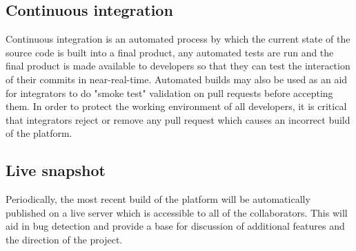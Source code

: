 \subsection{Continuous integration}
\label{sec:continuous-integration}

Continuous integration is an automated process by which the current state of the source code is
built into a final product, any automated tests are run and the final product is made available
to developers so that they can test the interaction of their commits in near-real-time.
Automated builds may also be used as an aid for integrators to do "smoke test" validation on pull
requests before accepting them. In order to protect the working environment of all developers,
it is critical that integrators reject or remove any pull request which causes an incorrect build
of the platform.

\subsection{Live snapshot}
\label{sec:live-snapshot}

Periodically, the most recent build of the \learnpad platform will be automatically published
on a live server which is accessible to all of the collaborators. This will aid in bug detection
and provide a base for discussion of additional features and the direction of the project.
